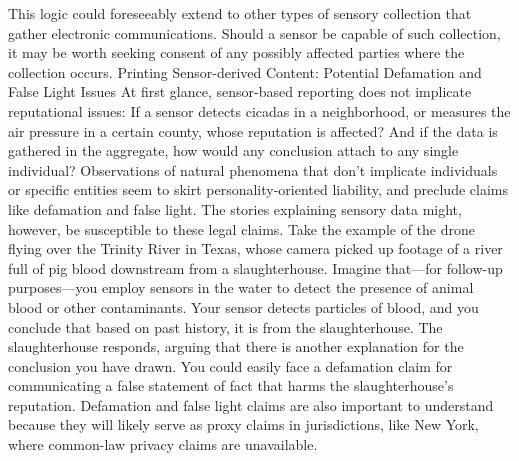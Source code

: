 This logic could foreseeably extend to other types of sensory collection that
gather electronic communications. Should a sensor be capable of such collection,
it may be worth seeking consent of any possibly affected parties
where the collection occurs.
Printing Sensor-derived Content:
Potential Defamation and False Light Issues
At first glance, sensor-based reporting does not implicate reputational
issues: If a sensor detects cicadas in a neighborhood, or measures the air
pressure in a certain county, whose reputation is affected? And if the data
is gathered in the aggregate, how would any conclusion attach to any single
individual? Observations of natural phenomena that don't implicate individuals
or specific entities seem to skirt personality-oriented liability, and
preclude claims like defamation and false light.
The stories explaining sensory data might, however, be susceptible to these
legal claims. Take the example of the drone flying over the Trinity River in
Texas, whose camera picked up footage of a river full of pig blood downstream
from a slaughterhouse. Imagine that—for follow-up purposes—you
employ sensors in the water to detect the presence of animal blood or other
contaminants. Your sensor detects particles of blood, and you conclude that
based on past history, it is from the slaughterhouse. The slaughterhouse
responds, arguing that there is another explanation for the conclusion you
have drawn. You could easily face a defamation claim for communicating a
false statement of fact that harms the slaughterhouse's reputation.
Defamation and false light claims are also important to understand because
they will likely serve as proxy claims in jurisdictions, like New York, where
common-law privacy claims are unavailable.

